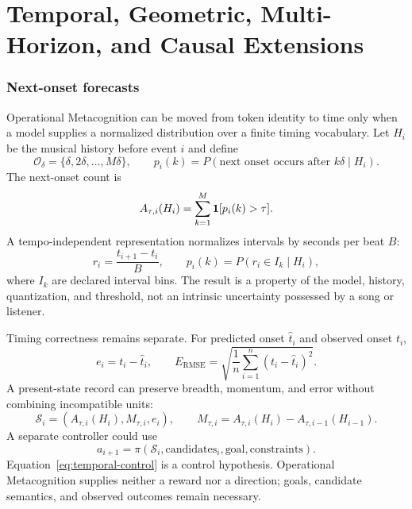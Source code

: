\clearpage
\part{Temporal, Geometric, Multi-Horizon, and Causal Extensions}

\section{Next-onset forecasts}
Operational Metacognition can be moved from token identity to time only when a model supplies a normalized distribution over a finite timing vocabulary. Let $H_i$ be the musical history before event $i$ and define
\begin{equation}
\mathcal O_\delta=\{\delta,2\delta,\ldots,M\delta\},\qquad
p_i(k)=P(\text{next onset occurs after }k\delta\mid H_i).
\end{equation}
The next-onset count is
\begin{equation}
A_{\tau,i}(H_i)=\sum_{k=1}^{M}\mathbf 1[p_i(k)>\tau].
\label{eq:onset-volume}
\end{equation}
A tempo-independent representation normalizes intervals by seconds per beat $B$:
\begin{equation}
r_i=\frac{t_{i+1}-t_i}{B},\qquad p_i(k)=P(r_i\in I_k\mid H_i),
\label{eq:normalized-interval}
\end{equation}
where $I_k$ are declared interval bins. The result is a property of the model, history, quantization, and threshold, not an intrinsic uncertainty possessed by a song or listener.

Timing correctness remains separate. For predicted onset $\hat t_i$ and observed onset $t_i$,
\begin{equation}
e_i=t_i-\hat t_i,\qquad
E_{\mathrm{RMSE}}=\sqrt{\frac1n\sum_{i=1}^{n}(t_i-\hat t_i)^2}.
\label{eq:timing-error}
\end{equation}
A present-state record can preserve breadth, momentum, and error without combining incompatible units:
\begin{equation}
\mathcal S_i=(A_{\tau,i}(H_i),M_{\tau,i},e_i),\qquad
M_{\tau,i}=A_{\tau,i}(H_i)-A_{\tau,i-1}(H_{i-1}).
\end{equation}
A separate controller could use
\begin{equation}
a_{i+1}=\pi(\mathcal S_i,\text{candidates}_i,\text{goal},\text{constraints}).
\label{eq:temporal-control}
\end{equation}
Equation~\eqref{eq:temporal-control} is a control hypothesis. Operational Metacognition supplies neither a reward nor a direction; goals, candidate semantics, and observed outcomes remain necessary.

